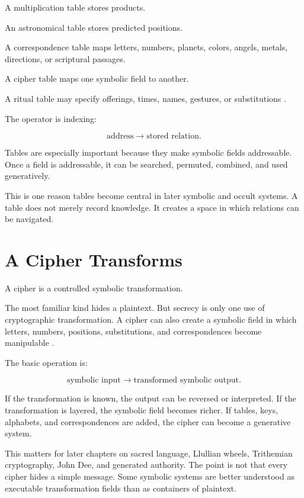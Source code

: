 \documentclass[11pt]{book}
\begin{document}
A multiplication table stores products.

An astronomical table stores predicted positions.

A correspondence table maps letters, numbers, planets, colors, angels, metals, directions, or scriptural passages.

A cipher table maps one symbolic field to another.

A ritual table may specify offerings, times, names, gestures, or substitutions \cite{Yates1966ArtMemory,Yates1964GiordanoBruno,Eco1995SearchPerfectLanguage,Scholem1974Kabbalah}.

The operator is indexing:

\[
\text{address}
\longrightarrow
\text{stored relation}.
\]

Tables are especially important because they make symbolic fields addressable. Once a field is addressable, it can be searched, permuted, combined, and used generatively.

This is one reason tables become central in later symbolic and occult systems. A table does not merely record knowledge. It creates a space in which relations can be navigated.

\section{A Cipher Transforms}

A cipher is a controlled symbolic transformation.

The most familiar kind hides a plaintext. But secrecy is only one use of cryptographic transformation. A cipher can also create a symbolic field in which letters, numbers, positions, substitutions, and correspondences become manipulable \cite{Kahn1996Codebreakers,Singh1999CodeBook,Trithemius1999Steganographia}.

The basic operation is:

\[
\text{symbolic input}
\longrightarrow
\text{transformed symbolic output}.
\]

If the transformation is known, the output can be reversed or interpreted. If the transformation is layered, the symbolic field becomes richer. If tables, keys, alphabets, and correspondences are added, the cipher can become a generative system.

This matters for later chapters on sacred language, Llullian wheels, Trithemian cryptography, John Dee, and generated authority. The point is not that every cipher hides a simple message. Some symbolic systems are better understood as executable transformation fields than as containers of plaintext.
\end{document}
